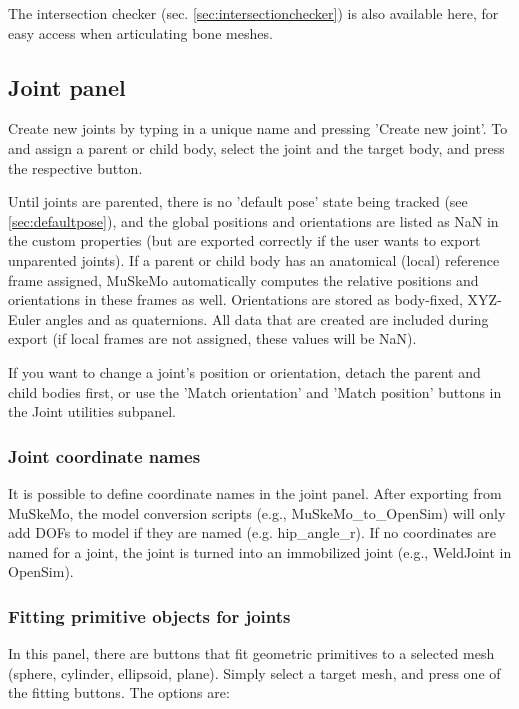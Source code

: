 \documentclass{article}
\begin{document}
The intersection checker (sec. \ref{sec:intersectionchecker}) is also available here, for easy access when articulating bone meshes.


\subsection{Joint panel}
\label{sec:jointpanel}

Create new joints by typing in a unique name and pressing 'Create new joint'. To and assign a parent or child body, select the joint and the target body, and press the respective button. 


Until joints are parented, there is no 'default pose' state being tracked (see \ref{sec:defaultpose}), and the global positions and orientations are listed as NaN in the custom properties (but are exported correctly if the user wants to export unparented joints). If a parent or child body has an anatomical (local) reference frame assigned, MuSkeMo automatically computes the relative positions and orientations in these frames as well. Orientations are stored as body-fixed, XYZ-Euler angles and as quaternions. All data that are created are included during export (if local frames are not assigned, these values will be NaN).

If you want to change a joint's position or orientation, detach the parent and child bodies first, or use the 'Match orientation' and 'Match position' buttons in the Joint utilities subpanel.

\subsubsection*{Joint coordinate names}

It is possible to define coordinate names in the joint panel. After exporting from MuSkeMo, the model conversion scripts (e.g., MuSkeMo\_to\_OpenSim) will only add DOFs to model if they are named (e.g. hip\_angle\_r). If no coordinates are named for a joint, the joint is turned into an immobilized joint (e.g., WeldJoint in OpenSim). 

\subsubsection{Fitting primitive objects for joints}
\label{sec:primitivefitting}
In this panel, there are buttons that fit geometric primitives to a selected mesh (sphere, cylinder, ellipsoid, plane). Simply select a target mesh, and press one of the fitting buttons. The options are:
\end{document}
